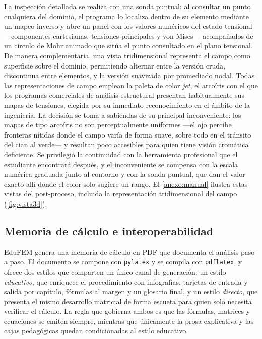 La inspección detallada se realiza con una sonda puntual: al consultar un punto cualquiera del dominio, el programa lo localiza dentro de su elemento mediante un mapeo inverso y abre un panel con los valores numéricos del estado tensional —componentes cartesianas, tensiones principales y von Mises— acompañados de un círculo de Mohr animado que sitúa el punto consultado en el plano tensional. De manera complementaria, una vista tridimensional representa el campo como superficie sobre el dominio, permitiendo alternar entre la versión cruda, discontinua entre elementos, y la versión suavizada por promediado nodal. Todas las representaciones de campo emplean la paleta de color \emph{jet}, el arcoíris con el que los programas comerciales de análisis estructural presentan habitualmente sus mapas de tensiones, elegida por su inmediato reconocimiento en el ámbito de la ingeniería. La decisión se toma a sabiendas de su principal inconveniente: los mapas de tipo arcoíris no son perceptualmente uniformes —el ojo percibe fronteras nítidas donde el campo varía de forma suave, sobre todo en el tránsito del cian al verde— y resultan poco accesibles para quien tiene visión cromática deficiente. Se privilegió la continuidad con la herramienta profesional que el estudiante encontrará después, y el inconveniente se compensa con la escala numérica graduada junto al contorno y con la sonda puntual, que dan el valor exacto allí donde el color solo sugiere un rango. El \autoref{anexo:manual} ilustra estas vistas del post-proceso, incluida la representación tridimensional del campo (\autoref{fig:vista3d}).

\subsection{Memoria de cálculo e interoperabilidad}
\label{sec:memoria-io}

EduFEM genera una memoria de cálculo en PDF que documenta el análisis paso a paso. El documento se compone con \texttt{pylatex} y se compila con \texttt{pdflatex}, y ofrece dos estilos que comparten un único canal de generación: un estilo \emph{educativo}, que enriquece el procedimiento con infografías, tarjetas de entrada y salida por capítulo, fórmulas al margen y un glosario final, y un estilo \emph{directo}, que presenta el mismo desarrollo matricial de forma escueta para quien solo necesita verificar el cálculo. La regla que gobierna ambos es que las fórmulas, matrices y ecuaciones se emiten siempre, mientras que únicamente la prosa explicativa y las cajas pedagógicas quedan condicionadas al estilo educativo.

